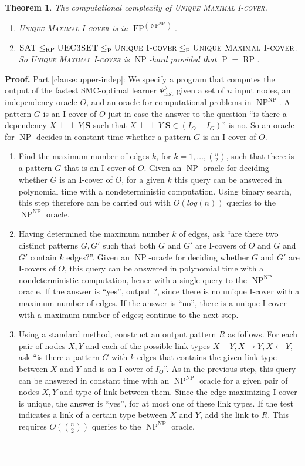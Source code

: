 \documentclass{elsarticle}%
\newtheorem{theorem}{Theorem}
\renewenvironment{proof}[1][Proof]{\noindent\textbf{#1.} }{\ \rule{0.5em}{0.5em}}
\DeclareMathOperator{\Poly}{\mathbf{\mathrm{P}}}
\DeclareMathOperator{\RP}{\mathbf{\mathrm{RP}}}
\DeclareMathOperator{\FP}{\mathbf{\mathrm{FP}}}
\DeclareMathOperator{\NP}{\mathbf{\mathrm{NP}}}
\newcommand{\indep}{\ensuremath{\perp{}\!\!\!\!\!\!\!\perp{}}}
\renewcommand{\S}{\mathbf{{S}}}
\newcommand{\R}{R}
\newcommand{\X}{X}
\newcommand{\Y}{Y}
\newcommand{\G}{G}
\renewcommand{\O}{O} %
\newcommand{\fast}{\mathrm{fast}}
\newcommand{\I}{\mathcal{I}}
\begin{document}
\begin{theorem} \label{theo:complex-indep} The computational complexity of \textsc{Unique Maximal I-cover}. 

\begin{enumerate}
\item \textsc{Unique Maximal
I-cover} is in $\FP^{(\NP^{\NP})}$. \label{clause:upper-indep}
\item $\textsc{SAT} \leq_{\RP} \textsc{UEC3SET} \leq_{\Poly} \textsc{Unique I-cover} \leq_{\Poly} \textsc{Unique Maximal I-cover}$. So \textsc{Unique Maximal
I-cover} is $\NP$-hard provided that $\Poly=\RP$. \label{clause:np-hard-indep}
\end{enumerate}

\end{theorem}
\begin{proof}
Part \ref{clause:upper-indep}: 
We specify a program that computes the output of the fastest SMC-optimal learner $\Psi^{\I}_{\fast}$ given a set of $n$ input nodes, an independency oracle $O$, and an oracle for computational problems in ${\NP}^{\NP}$. A pattern $\G$ is an I-cover of $O$ just in case the answer to the question ``is there a dependency $\X \indep \Y|\S$ such that $\X \indep \Y|\S \in (I_{O} - I_{\G})$'' is no. So an oracle for $\NP$ decides in constant time whether a pattern $\G$ is an I-cover of $O$.
\begin{enumerate}
\item Find the maximum number of edges $k$, for $k=1,\ldots,\binom{n}{2}$, such that there is a pattern $\G$ that is an I-cover of $\O$. Given an $\NP$-oracle for deciding whether $\G$ is an I-cover of $\O$, for a given $k$ this query can be answered in polynomial time with a nondeterministic computation. Using binary search, this step therefore can be carried out with $O(log(n))$ queries to the ${\NP}^{\NP}$ oracle. 
\item Having determined the maximum number $k$ of edges, ask ``are there two distinct patterns $\G,\G'$ such that both $\G$ and $\G'$ are I-covers of $O$ and $\G$ and $\G'$ contain $k$ edges{?}''. Given an $\NP$-oracle for deciding whether $\G$ and $\G'$ are I-covers of $\O$, this query can be answered in polynomial time with a nondeterministic computation, hence with a single query to the ${\NP}^{\NP}$ oracle. If the answer is ``yes'', output ?, since there is no unique I-cover with a maximum number of edges. If the answer is ``no'', there is a unique I-cover with a maximum number of edges; continue to the next step.
\item Using a standard method, construct an output pattern $\R$ as follows. For each pair of nodes $\X,\Y$ and each of the possible link types $\X-\Y, \X \rightarrow\Y, \X \leftarrow \Y$, ask ``is there a pattern $\G$ with $k$ edges that contains the given link type between $\X$ and $\Y$ and is an I-cover of $I_{O}$''. As in the previous step, this query can be answered in constant time with an ${\NP}^{\NP}$ oracle for a given pair of nodes $\X,\Y$ and type of link between them. Since the edge-maximizing I-cover is unique, the answer is ``yes'', for at most one of these link types. If the test indicates a link of a certain type between $\X$ and $\Y$, add the link to $\R$. This requires $O(\binom{n}{2})$ queries to the ${\NP}^{\NP}$ oracle. 

\end{enumerate}
\end{proof}
\end{document}
